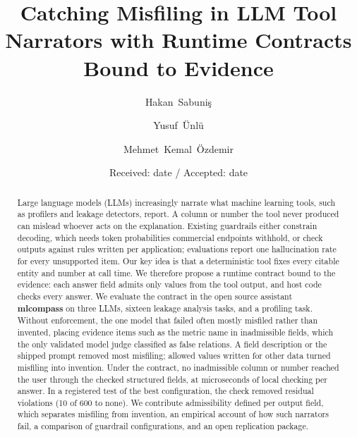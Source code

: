 \documentclass[smallextended,natbib]{svjour3}
\begin{document}
\title{Catching Misfiling in LLM Tool Narrators with Runtime Contracts Bound to Evidence}

\author{Hakan~Sabuni\c{s} \and Yusuf~\"Unl\"u \and Mehmet~Kemal~\"Ozdemir}


\date{Received: date / Accepted: date}

\maketitle

\begin{abstract}
Large language models (LLMs) increasingly narrate what machine learning
tools, such as profilers and leakage detectors, report. A column or number the
tool never produced can mislead whoever acts on the explanation. Existing
guardrails either constrain decoding, which needs token probabilities
commercial endpoints withhold, or check outputs against rules written per
application; evaluations report one hallucination rate for every unsupported
item. Our key idea is that a deterministic tool fixes every citable entity and
number at call time. We therefore propose a runtime contract bound to the
evidence: each answer field admits only values from the tool output, and host
code checks every answer. We evaluate the contract in the open source
assistant \textbf{mlcompass} on three LLMs, sixteen leakage analysis tasks,
and a profiling task. Without enforcement, the one model that failed often
mostly misfiled rather than invented, placing evidence items such as the
metric name in inadmissible fields, which the only validated model judge
classified as false relations. A field description or the shipped prompt
removed most misfiling; allowed values written for other data turned
misfiling into invention. Under the contract, no inadmissible column or number
reached the user through the checked structured fields, at microseconds of
local checking per answer. In a registered test of the best configuration, the
check removed residual violations (10 of 600 to none). We contribute
admissibility defined per output field, which separates misfiling from
invention, an empirical account of how such narrators fail, a comparison of
guardrail configurations, and an open replication package.
\end{abstract}
\end{document}
